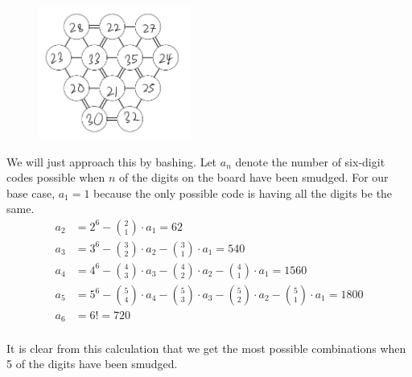 \documentclass[10pt]{../usamts}
\begin{document}
\begin{solution}
\begin{figure}[h!]
\includegraphics[width=5cm]{round2/solution1.jpeg}
\end{figure}
\end{solution}


\begin{solution}
We will just approach this by bashing. Let $a_n$ denote the number of six-digit codes possible when $n$ of the digits on the board have been smudged.
For our base case, $a_1 = 1$ because the only possible code is having all the digits be the same.
\begin{align*}
a_2 &= 2^6 - \binom{2}{1} \cdot a_1 = 62\\
a_3 &= 3^6 - \binom{3}{2} \cdot a_2 - \binom{3}{1} \cdot a_1 = 540\\
a_4 &= 4^6 - \binom{4}{3}\cdot a_3 - \binom{4}{2} \cdot a_2 - \binom{4}{1} \cdot a_1 = 1560\\
a_5 &= 5^6 - \binom{5}{4}\cdot a_4 - \binom{5}{3}\cdot a_3 - \binom{5}{2} \cdot a_2 - \binom{5}{1} \cdot a_1 = 1800\\
a_6 &= 6! = 720\\
\end{align*}

It is clear from this calculation that we get the most possible combinations when 5 of the digits have been smudged.

\end{solution}
\end{document}
